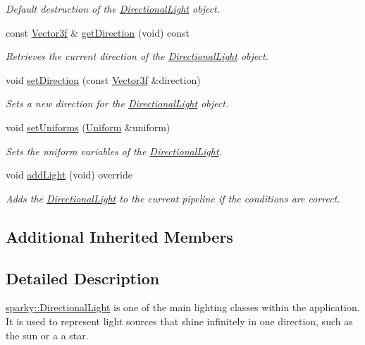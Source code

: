 \begin{DoxyCompactItemize}
\begin{DoxyCompactList}\small\item\em Default destruction of the \hyperlink{classsparky_1_1_directional_light}{Directional\+Light} object. \end{DoxyCompactList}\item 
const \hyperlink{classsparky_1_1_vector3}{Vector3f} \& \hyperlink{classsparky_1_1_directional_light_ac91ded5f841f3cb9e9c1a284c89edf69}{get\+Direction} (void) const 
\begin{DoxyCompactList}\small\item\em Retrieves the current direction of the \hyperlink{classsparky_1_1_directional_light}{Directional\+Light} object. \end{DoxyCompactList}\item 
void \hyperlink{classsparky_1_1_directional_light_a50ce7665c9f527de2b6a8cc0d6d98730}{set\+Direction} (const \hyperlink{classsparky_1_1_vector3}{Vector3f} \&direction)
\begin{DoxyCompactList}\small\item\em Sets a new direction for the \hyperlink{classsparky_1_1_directional_light}{Directional\+Light} object. \end{DoxyCompactList}\item 
void \hyperlink{classsparky_1_1_directional_light_abe0681b7aa12ee22ff3630302bff9e91}{set\+Uniforms} (\hyperlink{classsparky_1_1_uniform}{Uniform} \&uniform)
\begin{DoxyCompactList}\small\item\em Sets the uniform variables of the \hyperlink{classsparky_1_1_directional_light}{Directional\+Light}. \end{DoxyCompactList}\item 
void \hyperlink{classsparky_1_1_directional_light_ad6aa0a66026daab22b0d389100783c8d}{add\+Light} (void) override
\begin{DoxyCompactList}\small\item\em Adds the \hyperlink{classsparky_1_1_directional_light}{Directional\+Light} to the current pipeline if the conditions are correct. \end{DoxyCompactList}\end{DoxyCompactItemize}
\subsection*{Additional Inherited Members}


\subsection{Detailed Description}
\hyperlink{classsparky_1_1_directional_light}{sparky\+::\+Directional\+Light} is one of the main lighting classes within the application. It is used to represent light sources that shine infinitely in one direction, such as the sun or a a star.


